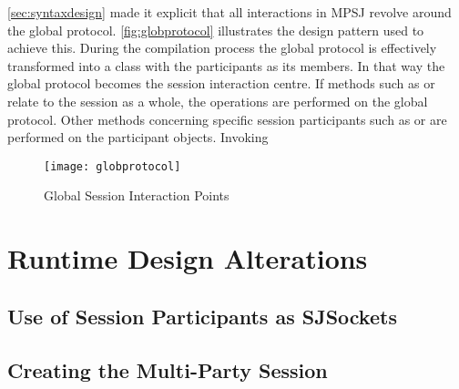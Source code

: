 \autoref{sec:syntaxdesign} made it explicit that all interactions in MPSJ revolve around the global protocol. \autoref{fig:globprotocol} illustrates the design pattern used to achieve this. During the compilation process the global protocol is effectively transformed into a class with the participants as its members. In that way the global protocol becomes the session interaction centre. If methods such as  or  relate to the session as a whole, the operations are performed on the global protocol. Other methods concerning specific session participants such as  or  are performed on the participant objects. Invoking  

\begin{figure}[htb]
\begin{center}
\texttt{[image: globprotocol]}
\caption{Global Session Interaction Points}
\label{fig:globprotocol}
\end{center}
\end{figure}



\section{Runtime Design Alterations}

\subsection{Use of Session Participants as SJSockets}

\subsection{Creating the Multi-Party Session}